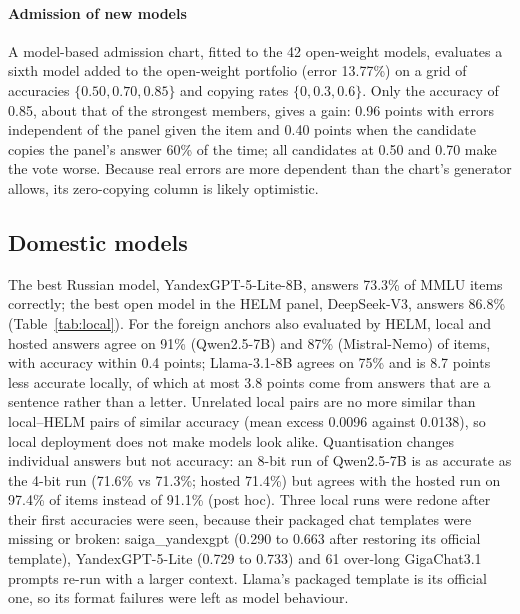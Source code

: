 \documentclass[preprint,12pt,authoryear]{elsarticle}
\begin{document}
\paragraph{Admission of new models} A model-based admission chart, fitted to the 42 open-weight models, evaluates a sixth model added to the open-weight portfolio (error 13.77\%) on a grid of accuracies $\{0.50, 0.70, 0.85\}$ and copying rates $\{0, 0.3, 0.6\}$. Only the accuracy of 0.85, about that of the strongest members, gives a gain: 0.96 points with errors independent of the panel given the item and 0.40 points when the candidate copies the panel's answer 60\% of the time; all candidates at 0.50 and 0.70 make the vote worse. Because real errors are more dependent than the chart's generator allows, its zero-copying column is likely optimistic.

\subsection{Domestic models}
The best Russian model, YandexGPT-5-Lite-8B, answers 73.3\% of MMLU items correctly; the best open model in the HELM panel, DeepSeek-V3, answers 86.8\% (Table~\ref{tab:local}). For the foreign anchors also evaluated by HELM, local and hosted answers agree on 91\% (Qwen2.5-7B) and 87\% (Mistral-Nemo) of items, with accuracy within 0.4 points; Llama-3.1-8B agrees on 75\% and is 8.7 points less accurate locally, of which at most 3.8 points come from answers that are a sentence rather than a letter. Unrelated local pairs are no more similar than local--HELM pairs of similar accuracy (mean excess 0.0096 against 0.0138), so local deployment does not make models look alike. Quantisation changes individual answers but not accuracy: an 8-bit run of Qwen2.5-7B is as accurate as the 4-bit run (71.6\% vs 71.3\%; hosted 71.4\%) but agrees with the hosted run on 97.4\% of items instead of 91.1\% (post hoc). Three local runs were redone after their first accuracies were seen, because their packaged chat templates were missing or broken: saiga\_yandexgpt (0.290 to 0.663 after restoring its official template), YandexGPT-5-Lite (0.729 to 0.733) and 61 over-long GigaChat3.1 prompts re-run with a larger context. Llama's packaged template is its official one, so its format failures were left as model behaviour.
\end{document}
